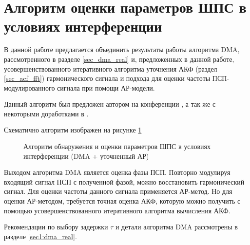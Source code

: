 \section{Алгоритм оценки параметров ШПС в условиях интерференции}
\label{l:ssec3_dma_lpc_algo}

В данной работе предлагается объединить результаты работы алгоритма DMA, рассмотренного в разделе
\ref{sec_dma_real} и, предложенных в данной работе, усовершенствованного итеративного 
алгоритма уточнения АКФ (раздел \ref{sec_acf_fft}) гармонического сигнала и 
подхода для оценки частоты ПСП-модулированного сигнала при помощи АР-модели.

Данный алгоритм был предложен автором на конференции \cite{my_dma_ar}, а так же с некоторыми доработками в \cite{my_otchet}.

Схематично алгоритм изображен на рисунке \ref{pic4:dma_quadruple_lpc}

\begin{figure}[h]
\center{}
	\caption{Алгоритм обнаружения и оценки параметров ШПС в условиях интерференции (DMA + уточненный АР)}
	\label{pic4:dma_quadruple_lpc}
\end{figure}

Выходом алгоритма DMA является оценка фазы ПСП. Повторно модулируя входящий сигнал ПСП с полученной
фазой, можно восстановить гармонический сигнал. Для оценки частоты данного сигнала применяется
АР-метод. Но для оценки АР-методом, требуется точная оценка АКФ, которую можно получить
с помощью усовершенствованного итеративного алгоритма вычисления АКФ.

Рекомендации по выбору задержки ${\tau}$ и детали алгоритма DMA рассмотрены в разделе
\ref{sec1:dma_real}.


